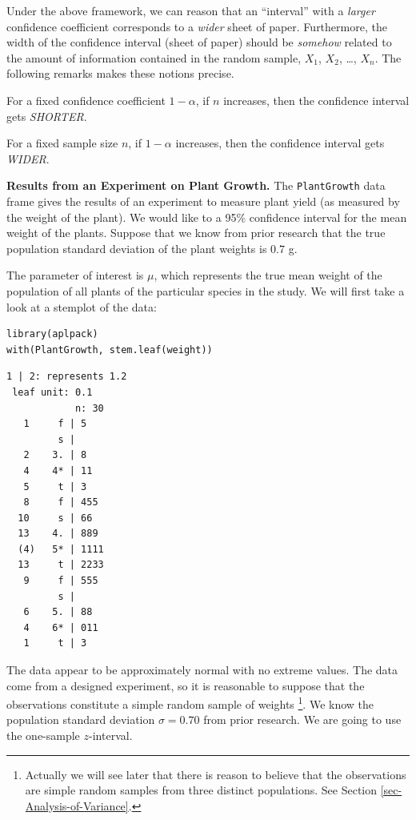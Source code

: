 \documentclass[captions=tableheading]{scrbook}
\begin{document}
Under the above framework, we can reason that an ``interval'' with a \emph{larger} confidence coefficient corresponds to a \emph{wider} sheet of paper. Furthermore, the width of the confidence interval (sheet of paper) should be \emph{somehow} related to the amount of information contained in the random sample, \(X_{1}\), \(X_{2}\), \ldots{},
\(X_{n}\). The following remarks makes these notions precise. 

\begin{rem}
For a fixed confidence coefficient \(1-\alpha\), if \(n\) increases, then the confidence interval gets \emph{SHORTER}.

For a fixed sample size \(n\), if \(1-\alpha\) increases, then the confidence interval gets \emph{WIDER}.
\end{rem}

\begin{example}
\textbf{Results from an Experiment on Plant Growth.} The \texttt{PlantGrowth} data frame gives the results of an experiment to measure plant yield (as measured by the weight of the plant). We would like to a 95\% confidence interval for the mean weight of the plants. Suppose that we know from prior research that the true population standard deviation of the plant weights is \(0.7\) g.

The parameter of interest is \(\mu\), which represents the true mean weight of the population of all plants of the particular species in the study. We will first take a look at a stemplot of the data:

\end{example}


\lstset{language=R}
\begin{lstlisting}
library(aplpack)
with(PlantGrowth, stem.leaf(weight))
\end{lstlisting}


\begin{verbatim}
1 | 2: represents 1.2
 leaf unit: 0.1
            n: 30
   1     f | 5
         s | 
   2    3. | 8
   4    4* | 11
   5     t | 3
   8     f | 455
  10     s | 66
  13    4. | 889
  (4)   5* | 1111
  13     t | 2233
   9     f | 555
         s | 
   6    5. | 88
   4    6* | 011
   1     t | 3
\end{verbatim}

The data appear to be approximately normal with no extreme values. The data come from a designed experiment, so it is reasonable to suppose that the observations constitute a simple random sample of weights
\footnote{Actually we will see later that there is reason to believe that the observations are simple random samples from three distinct populations. See Section \ref{sec-Analysis-of-Variance}.}. 
We know the population standard deviation \(\sigma=0.70\) from prior research. We are going to use the one-sample \(z\)-interval.
\end{document}
